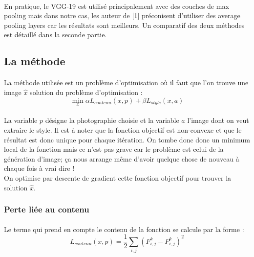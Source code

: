\documentclass{article}
\begin{document}
\paragraph*{}
En pratique, le VGG-19 est utilisé principalement avec des couches de max pooling mais dans notre cas, les auteur de [1] préconisent d'utiliser des average pooling layers car les résultats sont meilleurs. Un comparatif des deux méthodes est détaillé dans la seconde partie.

\subsection*{La méthode}
\paragraph*{}
La méthode utilisée est un problème d'optimisation où il faut que l'on trouve une image $\hat x$ solution du problème d'optimisation :
\begin{equation}
\min_x \alpha L_{contenu}(x, p) + \beta L_{style}(x, a)
\end{equation} 
\paragraph*{}
La variable $p$ désigne la photographie choisie et la variable $a$ l'image dont on veut extraire le style. Il est à noter que la fonction objectif est non-convexe et que le résultat est donc unique pour chaque itération. On tombe donc donc un minimum local de la fonction mais ce n'est pas grave car le problème est celui de la génération d'image; ça nous arrange même d'avoir quelque chose de nouveau à chaque fois à vrai dire !\\
On optimise par descente de gradient cette fonction objectif pour trouver la solution $\hat x$.

\subsubsection*{Perte liée au contenu}
\paragraph*{}
Le terme qui prend en compte le contenu de la fonction se calcule par la forme :
\begin{equation}
L_{contenu}(x,p) = \frac{1}{2} \sum_{i,j}(F_{i,j}^k-P_{i,j}^k)^2
\end{equation}
\end{document}
